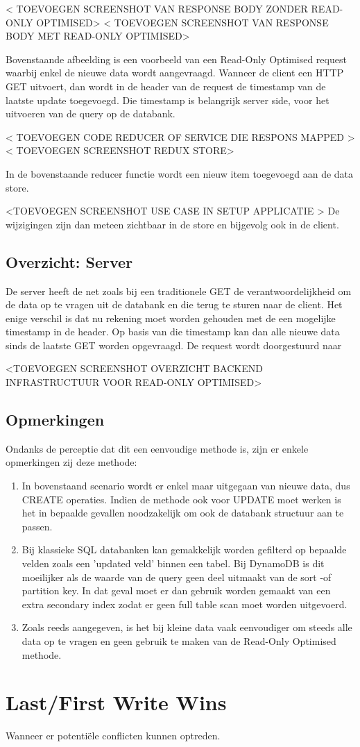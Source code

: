 < TOEVOEGEN SCREENSHOT VAN RESPONSE  BODY ZONDER READ-ONLY OPTIMISED>
< TOEVOEGEN SCREENSHOT VAN RESPONSE  BODY MET READ-ONLY OPTIMISED>

Bovenstaande afbeelding is een voorbeeld van een Read-Only Optimised request waarbij enkel de nieuwe data wordt aangevraagd. Wanneer de client een HTTP GET uitvoert, dan wordt in de header van de request de timestamp van de laatste update toegevoegd. Die timestamp is belangrijk server side, voor het uitvoeren van de query op de databank.

< TOEVOEGEN CODE REDUCER OF SERVICE DIE RESPONS MAPPED >
< TOEVOEGEN SCREENSHOT REDUX STORE>

In de bovenstaande reducer functie wordt een nieuw item toegevoegd aan de data store.

<TOEVOEGEN SCREENSHOT USE CASE IN SETUP APPLICATIE >
De wijzigingen zijn dan meteen zichtbaar in de store en bijgevolg ook in de client.
\subsection{Overzicht: Server}
De server heeft de net zoals bij een traditionele GET de verantwoordelijkheid om de data op te vragen uit de databank en die terug te sturen naar de client. Het enige verschil is dat nu rekening moet worden gehouden met de een mogelijke timestamp in de header. Op basis van die timestamp kan dan alle nieuwe data sinds de laatste GET worden opgevraagd. De request wordt doorgestuurd naar 

<TOEVOEGEN SCREENSHOT OVERZICHT BACKEND INFRASTRUCTUUR VOOR READ-ONLY OPTIMISED>

\subsection{Opmerkingen}
Ondanks de perceptie dat dit een eenvoudige methode is, zijn er enkele opmerkingen zij deze methode:
\begin{enumerate}
\item In bovenstaand scenario wordt er enkel maar uitgegaan van nieuwe data, dus CREATE operaties. Indien de methode ook voor UPDATE moet werken is het in bepaalde gevallen noodzakelijk om ook de databank structuur aan te passen.
\item Bij klassieke SQL databanken kan gemakkelijk worden gefilterd op bepaalde velden zoals een 'updated veld' binnen een tabel. Bij DynamoDB is dit moeilijker als de waarde van de query geen deel uitmaakt van de sort -of partition key. In dat geval moet er dan gebruik worden gemaakt van een extra secondary index zodat er geen full table scan moet worden uitgevoerd.
\item Zoals reeds aangegeven, is het bij kleine data vaak eenvoudiger om steeds alle data op te vragen en geen gebruik te maken van de Read-Only Optimised methode.
\end{enumerate}

\section{Last/First Write Wins}
Wanneer er potenti\"ele conflicten kunnen optreden.
